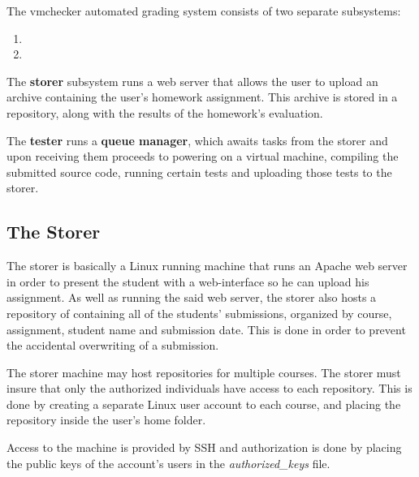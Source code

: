 The vmchecker automated grading system consists of two separate subsystems:
\begin{enumerate}
\item {}
\item {}
\end{enumerate}

\begin{center}
\end{center}

The {\bf storer} subsystem runs a web server that allows the user to upload an archive
containing the user's homework assignment. This archive is stored in a repository,
along with the results of the homework's evaluation.

The {\bf tester} runs a {\bf queue manager}, which awaits tasks from the storer and upon
receiving them proceeds to powering on a virtual machine, compiling the submitted
source code, running certain tests and uploading those tests to the storer.


\subsection{The Storer}
\label{sub-sec:storer}

The storer is basically a Linux running machine that runs an Apache web server
in order to present the student with a web-interface so he can upload his
assignment. As well as running the said web server, the storer also hosts a 
repository of containing all of the students' submissions, organized by course,
assignment, student name and submission date. This is done in order to prevent
the accidental overwriting of a submission.

\begin{center}
\end{center}

The storer machine may host repositories for multiple courses. The storer
must insure that only the authorized individuals have access to each repository.
This is done by creating a separate Linux user account to each course, and placing
the repository inside the user's home folder.

Access to the machine is provided by SSH and authorization is done by placing
the public keys of the account's users in the {\it authorized_keys} file.

